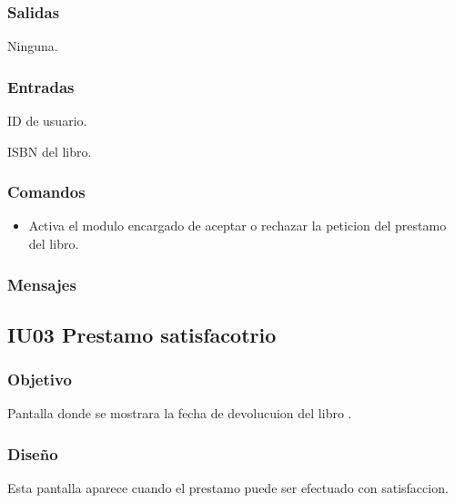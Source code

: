 
\subsubsection{Salidas}
	\begin{Citemize}
		\item Ninguna. 
	\end{Citemize}
	
\subsubsection{Entradas}
	\begin{Citemize}
		\item ID de usuario.
		\item ISBN del libro.
	\end{Citemize}

\subsubsection{Comandos}
\begin{itemize}
	\item  {} Activa el modulo encargado de aceptar o rechazar la peticion del prestamo del libro.
\end{itemize}

\subsubsection{Mensajes}
	\begin{Citemize}
		\item {\bf  {} }
	\end{Citemize}

\newpage
\subsection{IU03 Prestamo satisfacotrio}

\subsubsection{Objetivo}
	Pantalla donde se mostrara la fecha de devolucuion del libro .

\subsubsection{Diseño}
	Esta pantalla aparece cuando el prestamo puede ser efectuado con satisfaccion.

